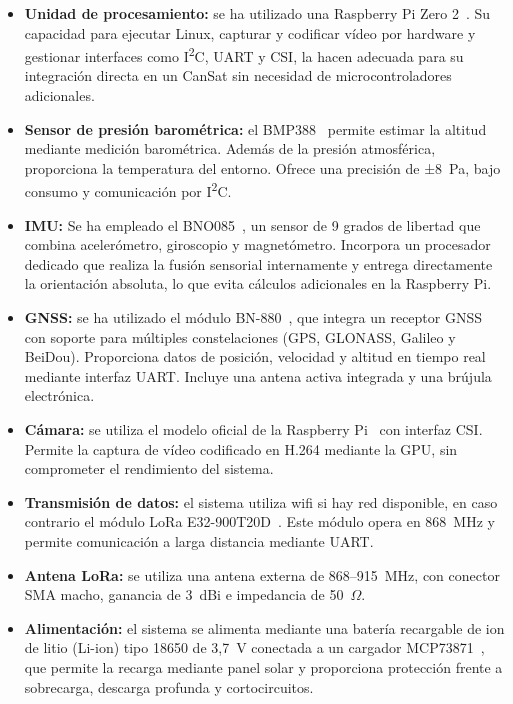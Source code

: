 \begin{itemize}
    \item \textbf{Unidad de procesamiento:} se ha utilizado una Raspberry Pi Zero 2~\cite{raspberrypi_zero2}.
    Su capacidad para ejecutar Linux, capturar y codificar vídeo por hardware y gestionar interfaces como I\textsuperscript{2}C, UART y CSI, la hacen adecuada para su integración directa en un CanSat sin necesidad de microcontroladores adicionales.
    \item \textbf{Sensor de presión barométrica:} el BMP388~\cite{adafruitBMP388} permite estimar la altitud mediante medición barométrica.
    Además de la presión atmosférica, proporciona la temperatura del entorno.
    Ofrece una precisión de ±8~Pa, bajo consumo y comunicación por I\textsuperscript{2}C.

    \item \textbf{IMU:} Se ha empleado el BNO085~\cite{adafruitBNO085}, un sensor de 9 grados de libertad que combina acelerómetro, giroscopio y magnetómetro.
    Incorpora un procesador dedicado que realiza la fusión sensorial internamente y entrega directamente la orientación absoluta, lo que evita cálculos adicionales en la Raspberry Pi.

    \item \textbf{GNSS:} se ha utilizado el módulo BN-880~\cite{bn880Module}, que integra un receptor GNSS con soporte para múltiples constelaciones (GPS, GLONASS, Galileo y BeiDou).
    Proporciona datos de posición, velocidad y altitud en tiempo real mediante interfaz UART. Incluye una antena activa integrada y una brújula electrónica.

    \item \textbf{Cámara:} se utiliza el modelo oficial de la Raspberry Pi~\cite{raspiCamV2} con interfaz CSI. Permite la captura de vídeo codificado en H.264 mediante la GPU, sin comprometer el rendimiento del sistema.

    \item \textbf{Transmisión de datos:} el sistema utiliza wifi si hay red disponible, en caso contrario el módulo LoRa E32-900T20D~\cite{ebyteE32}.
    Este módulo opera en 868~MHz y permite comunicación a larga distancia mediante UART.

    \item \textbf{Antena LoRa:} se utiliza una antena externa de 868–915~MHz, con conector SMA macho, ganancia de 3~dBi e impedancia de 50~\(\Omega\).


    \item \textbf{Alimentación:} el sistema se alimenta mediante una batería recargable de ion de litio (Li-ion) tipo 18650 de 3{,}7~V conectada a un cargador MCP73871~\cite{mcp73871Datasheet}, que permite la recarga mediante panel solar y proporciona protección frente a sobrecarga, descarga profunda y cortocircuitos.


\end{itemize}
